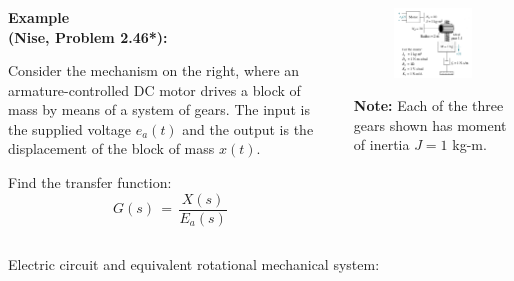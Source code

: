 \documentclass[ 10pt, xcolor = dvipsnames]{beamer}
\begin{document}
\begin{frame}[allowframebreaks]
\frametitle{\insertsection}

\begin{columns}

\begin{column}{0.45\textwidth}
\textbf{Example \\ (Nise, Problem 2.46*):}
\halfskip

Consider the mechanism on the right, where an armature-controlled DC motor drives a block of mass by means of a system of gears. The input is the supplied voltage $e_a(t)$ and the output is the displacement of the block of mass $x(t)$. 
\halfskip

Find the transfer function:
\[
G(s) \, = \, \frac{X(s)}{E_a(s)}
\]

\end{column}

\begin{column}{0.45\textwidth}
\begin{figure}[htb]
\centering
\includegraphics[width=\columnwidth]{nise_prob-2-46.jpeg}
\end{figure}
\fullskip
{
\small
\textbf{Note:} Each of the three gears shown has moment of inertia $J = 1$ kg-m. 
}

\end{column}

\end{columns}
\framebreak

Electric circuit and equivalent rotational mechanical system: 
\begin{figure}[htb]
\centering
\def\svgwidth{0.9\columnwidth}

\end{figure}

\end{frame}
\end{document}
